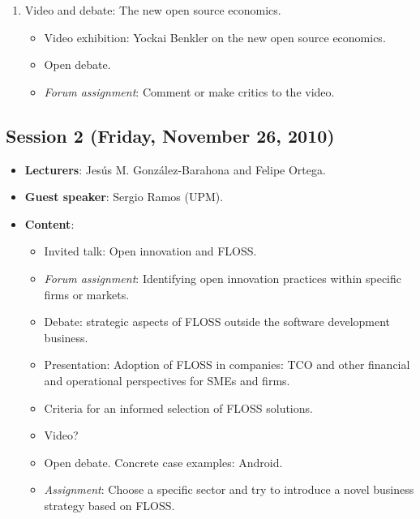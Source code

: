 \documentclass[a4paper]{article}
\begin{document}
\begin{itemize}
\begin{enumerate}
     \item Video and debate: The new open source economics.

	  \begin{itemize}
	   \item Video exhibition: Yockai Benkler on the new open source economics.
	   \item Open debate.
	   \item \textit{Forum assignment}: Comment or make critics to the video.
	  \end{itemize}

    \end{enumerate}

\end{itemize}


\subsection{Session 2 (Friday, November 26, 2010)}

\begin{itemize}
 \item \textbf{Lecturers}: Jesús M. González-Barahona and Felipe Ortega.
 \item \textbf{Guest speaker}: Sergio Ramos (UPM).

 \item \textbf{Content}:

    \begin{itemize}
     \item Invited talk: Open innovation and FLOSS.
     \item \textit{Forum assignment}: Identifying open innovation practices within specific firms or markets.

     \item Debate: strategic aspects of FLOSS outside the software development business.
        \item Presentation: Adoption of FLOSS in companies: TCO and other financial and 
	operational perspectives for SMEs and firms.
	\item Criteria for an informed selection of FLOSS solutions.
	\item Video?
	\item Open debate. Concrete case examples: Android.
        \item \textit{Assignment}: Choose a specific sector and try to introduce a novel business strategy
	based on FLOSS.
    \end{itemize}

\end{itemize}
\end{document}
